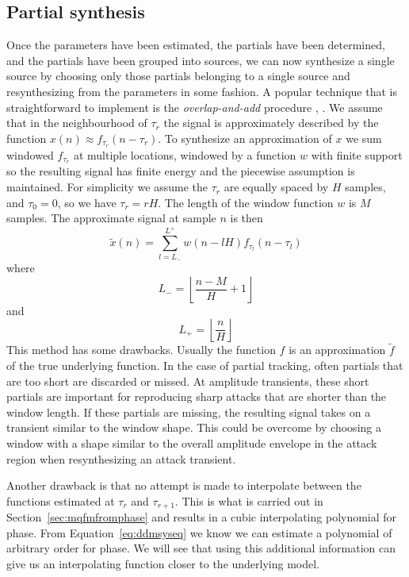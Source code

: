 \documentclass[letterpaper,12pt]{report}
\begin{document}
\subsection{Partial synthesis}

Once the parameters have been estimated, the partials have been determined, and
the partials have been grouped into sources, we can now synthesize a single
source by choosing only those partials belonging to a single source and
resynthesizing from the parameters in some fashion. A popular technique that is
straightforward to implement is the \textit{overlap-and-add} procedure
\cite{portnoff1976implementation}, \cite{moore1990elements}. We assume that in
the neighbourhood of $\tau_{r}$ the signal is approximately described by the
function $x(n) \approx f_{\tau_{r}}(n-\tau_{r})$. To synthesize an approximation of $x$
we sum windowed $f_{\tau_{r}}$ at multiple locations, windowed by a function $w$
with finite support so
the resulting signal has finite energy and the piecewise assumption is
maintained. For simplicity we assume the $\tau_{r}$ are equally spaced by $H$
samples, and $\tau_{0}=0$, so we have $\tau_{r} = rH$. The length of the window
function $w$ is $M$ samples. The approximate signal at sample $n$ is then
\[
    \tilde{x}(n) = \sum_{l=L_{-}}^{L^{+}} w(n-lH) f_{\tau_l}(n-\tau_l)
\]
where
\[
    L_{-} = \left\lfloor \frac{n-M}{H} + 1 \right\rfloor
\]
and
\[
    L_{+} = \left\lfloor \frac{n}{H} \right\rfloor
\]
This method has some drawbacks. Usually the function $f$ is an approximation
$\tilde{f}$ of the true underlying function. In the case of partial tracking,
often partials that are too short are discarded or missed. At amplitude
transients, these short partials are important for reproducing sharp attacks
that are shorter than the window length. If these partials are missing, the
resulting signal takes on a transient similar to the window shape. This could be
overcome by choosing a window with a shape similar to the overall amplitude
envelope in the attack region when resynthesizing an attack transient.

Another drawback is that no attempt is made to interpolate between the functions
estimated at $\tau_{r}$ and $\tau_{r+1}$. This is what is carried out in
Section~\ref{sec:mqfmfromphase} and results in a cubic interpolating polynomial
for phase. From Equation~\ref{eq:ddmsyseq} we know we can estimate a polynomial
of arbitrary order for phase. We will see that using this additional information
can give us an interpolating function closer to the underlying model.
\end{document}
